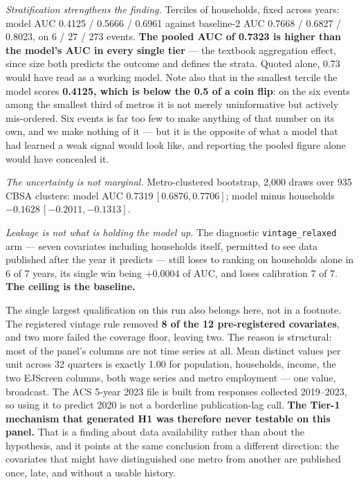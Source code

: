 \documentclass[conference]{IEEEtran}
\begin{document}
\emph{Stratification strengthens the finding.} Terciles of households, fixed
across years: model AUC 0.4125 / 0.5666 / 0.6961 against baseline-2 AUC
0.7668 / 0.6827 / 0.8023, on 6 / 27 / 273 events. \textbf{The pooled AUC of
0.7323 is higher than the model's AUC in every single tier} --- the textbook
aggregation effect, since size both predicts the outcome and defines the
strata. Quoted alone, 0.73 would have read as a working model. Note also that
in the smallest tercile the model scores \textbf{0.4125, which is below the
0.5 of a coin flip}: on the six events among the smallest third of metros it
is not merely uninformative but actively mis-ordered. Six events is far too
few to make anything of that number on its own, and we make nothing of it ---
but it is the opposite of what a model that had learned a weak signal would
look like, and reporting the pooled figure alone would have concealed it.

\emph{The uncertainty is not marginal.} Metro-clustered bootstrap, 2{,}000
draws over 935 CBSA clusters: model AUC $0.7319\,[0.6876, 0.7706]$;
model minus households $-0.1628\,[-0.2011, -0.1313]$.

\emph{Leakage is not what is holding the model up.} The diagnostic
\texttt{vintage\_relaxed} arm --- seven covariates including households
itself, permitted to see data published after the year it predicts --- still
loses to ranking on households alone in 6 of 7 years, its single win being
$+0.0004$ of AUC, and loses calibration 7 of 7. \textbf{The ceiling is the
baseline.}

The single largest qualification on this run also belongs here, not in a
footnote. The registered vintage rule removed \textbf{8 of the 12
pre-registered covariates}, and two more failed the coverage floor, leaving
two. The reason is structural: most of the panel's columns are not time series
at all. Mean distinct values per unit across 32 quarters is exactly 1.00 for
population, households, income, the two EJScreen columns, both wage series and
metro employment --- one value, broadcast. The ACS 5-year 2023 file is built
from responses collected 2019--2023, so using it to predict 2020 is not a
borderline publication-lag call. \textbf{The Tier-1 mechanism that generated
H1 was therefore never testable on this panel.} That is a finding about data
availability rather than about the hypothesis, and it points at the same
conclusion from a different direction: the covariates that might have
distinguished one metro from another are published once, late, and without a
usable history.
\end{document}

